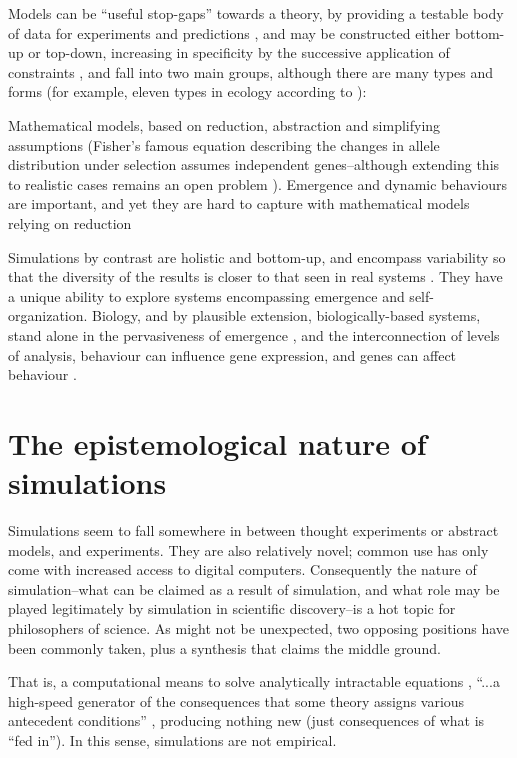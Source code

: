 Models can be ``useful stop-gaps'' towards a theory, by providing a testable body of data for experiments and predictions \parencite{Krakauer2011}, and may be constructed either bottom-up or top-down, increasing in specificity by the successive application of constraints \parencite{Krakauer2011}, and fall into two main groups, although there are many types and forms (for example, eleven types in ecology according to \parencite{Jorgensen2008}):

Mathematical models, based on reduction, abstraction and simplifying assumptions (\eg Fisher's famous equation describing the changes in allele distribution under selection assumes independent genes--although extending this to realistic cases remains an open problem \parencite{Schuster2011}). Emergence and dynamic behaviours are important, and yet they are hard to capture with mathematical models relying on reduction \parencite{Ferrer:2008hv}

Simulations by contrast are holistic and bottom-up, and encompass variability so that the diversity of the results is closer to that seen in real systems \parencite{Ferrer:2008hv}. They have a unique ability to explore systems encompassing emergence and self-organization. Biology, and by plausible extension, biologically-based systems, stand alone in the pervasiveness of emergence \parencite{Bersini:2006ve}, and the interconnection of levels of analysis, \eg behaviour can influence gene expression, and genes can affect behaviour \parencite{Krakauer2011}.

\section{The epistemological nature of simulations}\label{the-epistemological-nature-of-simulations}

Simulations seem to fall somewhere in between thought experiments or abstract models, and experiments. They are also relatively novel; common use has only come with increased access to digital computers. Consequently the nature of simulation--what can be claimed as a result of simulation, and what role may be played legitimately by simulation in scientific discovery--is a hot topic for philosophers of science. As might not be unexpected, two opposing positions have been commonly taken, plus a synthesis that claims the middle ground.


That is, a computational means to solve analytically intractable equations \parencite[31]{Winsberg2010}, ``...a high-speed generator of the consequences that some theory assigns various antecedent conditions'' \parencite[quoting from Dennett]{Eldridge}, producing nothing new (just consequences of what is ``fed in''\parencite{DiPaolo2000}). In this sense, simulations are not empirical.

